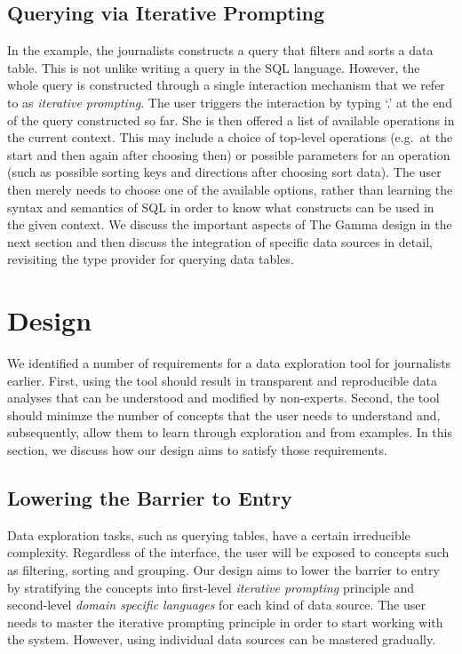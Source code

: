\documentclass{sigchi}
\newcommand{\ikvd}[1]{{\fontfamily{zi4}\selectfont\small #1}}
\begin{document}
\subsection{Querying via Iterative Prompting}
In the example, the journalists constructs a query that filters and sorts a data table. This is
not unlike writing a query in the SQL language. However, the whole query is constructed through
a single interaction mechanism that we refer to as \emph{iterative prompting}. The user triggers
the interaction by typing `.' at the end of the query constructed so far. She is then offered a
list of available operations in the current context. This may include a choice of top-level
operations (e.g.~at the start and then again after choosing \ikvd{then}) or possible
parameters for an operation (such as possible sorting keys and directions after choosing
\ikvd{sort data}). The user then merely needs to choose one of the available options, rather than
learning the syntax and semantics of SQL in order to know what constructs can be used in the
given context.
We discuss the important aspects of The Gamma design in the next section and then discuss the
integration of specific data sources in detail, revisiting the type provider for querying
data tables.


\section{Design}
\label{sec:design}

We identified a number of requirements for a data exploration tool for journalists earlier.
First, using the tool should result in transparent and reproducible data analyses that can be
understood and modified by non-experts. Second, the tool should minimze the number of concepts
that the user needs to understand and, subsequently, allow them to learn through exploration
and from examples. In this section, we discuss how our design aims to satisfy those requirements.

\subsection{Lowering the Barrier to Entry}
Data exploration tasks, such as querying tables, have a certain irreducible complexity.
Regardless of the interface, the user will be exposed to concepts such as filtering,
sorting and grouping. Our design aims to lower the barrier to entry by stratifying the concepts
into first-level \emph{iterative prompting} principle and second-level \emph{domain specific
languages} for each kind of data source.
The user needs to master the iterative prompting principle in order to start working
with the system. However, using individual data sources can be mastered gradually.
\end{document}
